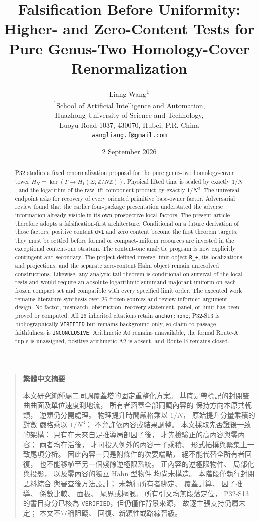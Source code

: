 \documentclass[11pt]{article}
\title{Falsification Before Uniformity:\\
Higher- and Zero-Content Tests for Pure Genus-Two Homology-Cover Renormalization}
\author{Liang Wang\textsuperscript{1}\\
\small \textsuperscript{1}School of Artificial Intelligence and Automation,\\
\small Huazhong University of Science and Technology,\\
\small Luoyu Road 1037, 430070, Hubei, P.R. China\\
\small \texttt{wangliang.f@gmail.com}}
\date{2 September 2026}
\newenvironment{zhabstract}
  {\begin{quotation}\cjkfont\small\raggedright\noindent\textbf{繁體中文摘要}\par\smallskip\mdseries}
  {\end{quotation}}
\begin{document}
\maketitle

\begin{abstract}

P32 studies a fixed renormalization proposal for the pure genus-two
homology-cover tower
$H_N=\ker(\Gamma\to H_1(\Sigma;\mathbb Z/N\mathbb Z))$. Physical
lifted time is scaled by exactly $1/N$, and the logarithm of the
raw lift-component product by exactly $1/N^3$. The universal
endpoint asks for recovery of every oriented primitive base-owner
factor. Adversarial review found that the earlier four-package presentation
understated the adverse information already visible in its own
prospective local factors. The present article therefore adopts a
falsification-first architecture. Conditional on a future derivation of
those factors, positive content \texttt{d\textgreater{}1} and zero
content become the first theorem targets; they must be settled before
formal or compact-uniform resources are invested in the exceptional
content-one stratum. The content-one analytic program is now explicitly
contingent and secondary. The project-defined inverse-limit object
\texttt{R\_+}, its localizations and projections, and the separate
zero-content Hahn object remain unresolved constructions. Likewise, any
analytic tail theorem is conditional on survival of the local tests and
would require an absolute logarithmic-summand majorant uniform on each
frozen compact set and compatible with every specified limit order. The
executed work remains literature synthesis over 26 frozen sources and
review-informed argument design. No factor, mismatch, obstruction,
recovery statement, panel, or limit has been proved or computed. All 26
inherited citations retain \texttt{anchor:none}; P32-S13 is
bibliographically \texttt{VERIFIED} but remains background-only, so
claim-to-passage faithfulness is \texttt{INCONCLUSIVE}. Arithmetic A0 remains unavailable, the formal
Route-A tuple is unassigned, positive arithmetic A2 is absent, and Route
B remains closed.
\end{abstract}

\begin{zhabstract}
本文研究純種屬二同調覆蓋塔的固定重整化方案。 基底是帶標記的封閉雙曲曲面及單位速度測地流， 所有者涵蓋全部同調內容的 保持方向本原共軛類， 逆類仍分開處理。 物理提升時間嚴格乘以 $1/N$， 原始提升分量乘積的對數 嚴格乘以 $1/N^3$； 不允許依內容或結果調整。 本文採取先否證後一致的架構： 只有在未來自足推導局部因子後， 才先檢驗正的高內容與零內容； 兩者均存活後， 才可投入例外的內容一子乘積、 形式拓撲與緊集上一致尾項分析。 因此內容一只是附條件的次要端點， 絕不能代替全所有者回復， 也不能移植至另一個殘餘逆極限系統。 正內容的逆極限物件、 局部化與投影， 以及零內容的獨立 Hahn 型物件 均尚未構造。 本階段僅執行封閉語料綜合 與審查後方法設計； 未執行所有者綁定、 覆蓋計算、 因子推導、 係數比較、 面板、 尾界或極限。 所有引文均無段落定位， P32-S13 的書目身分已核為 \texttt{VERIFIED}，但仍僅作背景來源， 故逐主張支持仍屬未定； 本文不宣稱阻礙、 回復、新穎性或路線晉級。
\end{zhabstract}
\end{document}
